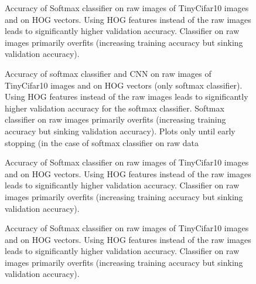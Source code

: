 \begin{figure}[h!t]
\newcommand{\plotref}[1]{{[~\ref{plt:#1}~]}}
\centering
\caption{Accuracy of Softmax classifier on raw images of TinyCifar10 images and on HOG vectors. Using HOG features instead of the raw images leads to significantly higher validation accuracy. Classifier on raw images primarily overfits (increasing training accuracy but sinking validation accuracy). } %
\label{figparam}

\end{figure}

\begin{figure}[h!t]
\newcommand{\plotref}[1]{{[~\ref{plt:#1}~]}}
\centering
\caption{Accuracy of softmax classifier and CNN on raw images of TinyCifar10 images and on HOG vectors (only softmax classifier). Using HOG features instead of the raw images leads to significantly higher validation accuracy for the softmax classifier. Softmax classifier on raw images primarily overfits (increasing training accuracy but sinking validation accuracy). Plots only until early stopping (in the case of softmax classifier on raw data  } %
\label{figparam}

\end{figure}


\begin{figure}[h!t]
\newcommand{\plotref}[1]{{[~\ref{plt:#1}~]}}
\centering
\caption{Accuracy of Softmax classifier on raw images of TinyCifar10 images and on HOG vectors. Using HOG features instead of the raw images leads to significantly higher validation accuracy. Classifier on raw images primarily overfits (increasing training accuracy but sinking validation accuracy). } %
\label{figparam}

\end{figure}




\begin{figure}[h!t]
\newcommand{\plotref}[1]{{[~\ref{plt:#1}~]}}
\centering
\caption{Accuracy of Softmax classifier on raw images of TinyCifar10 images and on HOG vectors. Using HOG features instead of the raw images leads to significantly higher validation accuracy. Classifier on raw images primarily overfits (increasing training accuracy but sinking validation accuracy). } %
\label{figparam}

\end{figure}



